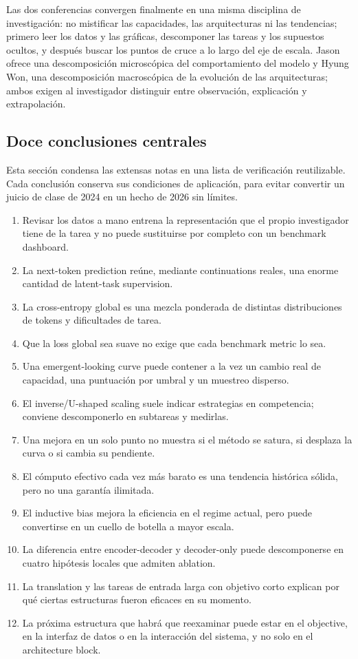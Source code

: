 \documentclass[a4paper]{article}
\begin{document}
Las dos conferencias convergen finalmente en una misma disciplina de investigación: no mistificar las capacidades, las arquitecturas ni las tendencias; primero leer los datos y las gráficas, descomponer las tareas y los supuestos ocultos, y después buscar los puntos de cruce a lo largo del eje de escala. Jason ofrece una descomposición microscópica del comportamiento del modelo y Hyung Won, una descomposición macroscópica de la evolución de las arquitecturas; ambos exigen al investigador distinguir entre observación, explicación y extrapolación.

\subsection{Doce conclusiones centrales}

Esta sección condensa las extensas notas en una lista de verificación reutilizable. Cada conclusión conserva sus condiciones de aplicación, para evitar convertir un juicio de clase de 2024 en un hecho de 2026 sin límites.

\begin{enumerate}
  \item Revisar los datos a mano entrena la representación que el propio investigador tiene de la tarea y no puede sustituirse por completo con un benchmark dashboard.
  \item La next-token prediction reúne, mediante continuations reales, una enorme cantidad de latent-task supervision.
  \item La cross-entropy global es una mezcla ponderada de distintas distribuciones de tokens y dificultades de tarea.
  \item Que la loss global sea suave no exige que cada benchmark metric lo sea.
  \item Una emergent-looking curve puede contener a la vez un cambio real de capacidad, una puntuación por umbral y un muestreo disperso.
  \item El inverse/U-shaped scaling suele indicar estrategias en competencia; conviene descomponerlo en subtareas y medirlas.
  \item Una mejora en un solo punto no muestra si el método se satura, si desplaza la curva o si cambia su pendiente.
  \item El cómputo efectivo cada vez más barato es una tendencia histórica sólida, pero no una garantía ilimitada.
  \item El inductive bias mejora la eficiencia en el regime actual, pero puede convertirse en un cuello de botella a mayor escala.
  \item La diferencia entre encoder-decoder y decoder-only puede descomponerse en cuatro hipótesis locales que admiten ablation.
  \item La translation y las tareas de entrada larga con objetivo corto explican por qué ciertas estructuras fueron eficaces en su momento.
  \item La próxima estructura que habrá que reexaminar puede estar en el objective, en la interfaz de datos o en la interacción del sistema, y no solo en el architecture block.
\end{enumerate}
\end{document}
